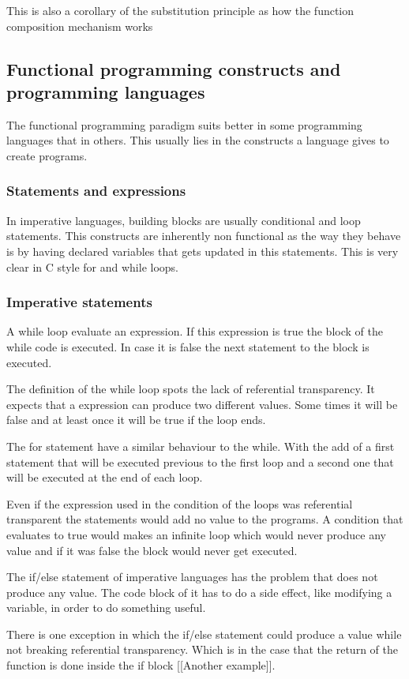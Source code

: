 \documentclass[../main.tex]{subfiles}
\begin{document}
This is also a corollary of the substitution principle as how the function
composition mechanism works

\subsection{Functional programming constructs and programming languages} The
functional programming paradigm suits better in some programming languages that
in others. This usually lies in the constructs a language gives to create
programs.

\subsubsection{Statements and expressions} In imperative languages, building
blocks are usually conditional and loop statements. This constructs are
inherently non functional as the way they behave is by having declared variables
that gets updated in this statements. This is very clear in C style for and
while loops.

\subsubsection{Imperative statements} A while loop evaluate an expression. If
this expression is true the block of the while code is executed. In case it is
false the next statement to the block is executed.

The definition of the while loop spots the lack of referential transparency. It
expects that a expression can produce two different values. Some times it will
be false and at least once it will be true if the loop ends.

The for statement have a similar behaviour to the while. With the add of a first
statement that will be executed previous to the first loop and a second one that
will be executed at the end of each loop.

Even if the expression used in the condition of the loops was referential
transparent the statements would add no value to the programs. A condition that
evaluates to true would makes an infinite loop which would never produce any
value and if it was false the block would never get executed.

The if/else statement of imperative languages has the problem that does not
produce any value. The code block of it has to do a side effect, like modifying
a variable, in order to do something useful.

There is one exception in which the if/else statement could produce a value
while not breaking referential transparency. Which is in the case that the
return of the function is done inside the if block [[Another example]].
\end{document}
